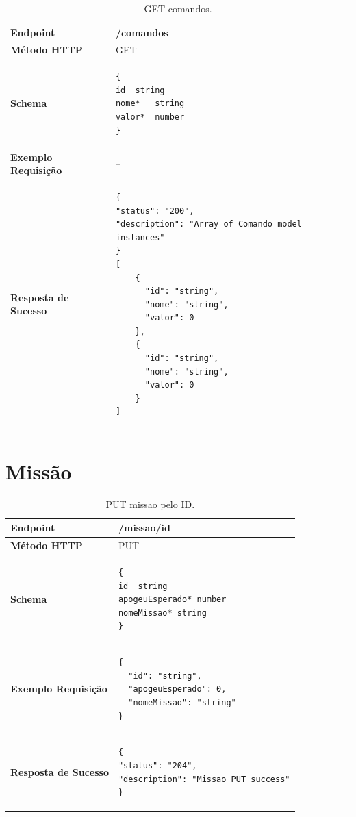 \begin{apendicesenv}
\begin{table}[H]
\begin{tabular}{|l|l|}
\hline
\textbf{Endpoint}            & /comandos \\ \hline
\textbf{Método HTTP}         & GET \\ \hline
\textbf{Schema}              & 
\begin{lstlisting}
{
id	string
nome*	string
valor*	number
}
\end{lstlisting} \\ \hline
\textbf{Exemplo Requisição}  & -- \\ \hline
\textbf{Resposta de Sucesso} &
\begin{lstlisting}
{
"status": "200",
"description": "Array of Comando model instances"
}
[
    {
      "id": "string",
      "nome": "string",
      "valor": 0
    },
    {
      "id": "string",
      "nome": "string",
      "valor": 0
    }
]
\end{lstlisting} \\ \hline
\end{tabular}
\caption{GET comandos.}
\label{get_comandos}
\end{table}


\section{Missão}

\begin{table}[H]
\begin{tabular}{|l|l|}
\hline
\textbf{Endpoint}            & /missao/{id} \\ \hline
\textbf{Método HTTP}         & PUT \\ \hline
\textbf{Schema}              &  
\begin{lstlisting}
{
id	string
apogeuEsperado*	number
nomeMissao*	string
}
\end{lstlisting}\\ \hline
\textbf{Exemplo Requisição}  &  
\begin{lstlisting}
{
  "id": "string",
  "apogeuEsperado": 0,
  "nomeMissao": "string"
}
\end{lstlisting} \\ \hline
\textbf{Resposta de Sucesso} &
\begin{lstlisting}
{
"status": "204",
"description": "Missao PUT success"
}
\end{lstlisting}
\\ \hline
\end{tabular}
\caption{PUT  missao pelo ID.}
\label{put_missao}
\end{table}


\end{apendicesenv}
